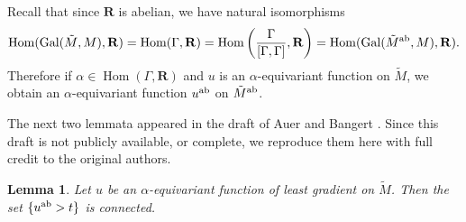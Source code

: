 \documentclass[reqno,11pt]{amsart}
\newcommand{\RR}{\mathbf{R}}
\DeclareMathOperator{\Hom}{Hom}
\DeclareMathOperator{\Gal}{Gal}
\newtheorem{lemma}[theorem]{Lemma}
\theoremstyle{definition}
\numberwithin{equation}{section}
\begin{document}
Recall that since $\RR$ is abelian, we have natural isomorphisms
$$\Hom(\Gal(\tilde M, M), \RR) = \Hom(\Gamma, \RR) = \Hom\left(\frac{\Gamma}{[\Gamma, \Gamma]}, \RR\right) = \Hom(\Gal(\tilde M^{\rm ab}, M), \RR).$$
Therefore if $\alpha \in \Hom(\Gamma, \RR)$ and $u$ is an $\alpha$-equivariant function on $\tilde M$, we obtain an $\alpha$-equivariant function $u^{\rm ab}$ on $\tilde M^{\rm ab}$.

The next two lemmata appeared in the draft of Auer and Bangert \cite{Auer12}.
Since this draft is not publicly available, or complete, we reproduce them here with full credit to the original authors.

\begin{lemma}\label{superlevel sets are connected}
Let $u$ be an $\alpha$-equivariant function of least gradient on $\tilde M$.
Then the set $\{u^{\rm ab} > t\}$ is connected.
\end{lemma}
\end{document}
